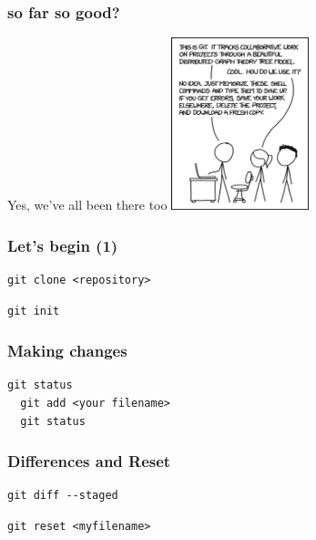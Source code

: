 \documentclass{beamer}
\begin{document}
\begin{frame}[fragile]
  \frametitle{so far so good?}

  \begin{block}{Yes, we've all been there too}
    \includegraphics[height=5cm]{xkcd.png}
  \end{block}

\end{frame}



\begin{frame}[fragile]
  \frametitle{Let's begin (1)}
  \begin{lstlisting}[caption=we can clone a repository from somewhere] 
  git clone <repository>
  \end{lstlisting}

  \begin{lstlisting}[caption=or create a new repository] 
  git init 
  \end{lstlisting}

\end{frame}


\begin{frame}[fragile]
  \frametitle{Making changes}
  
  \begin{lstlisting}[caption=Making changes] 
  git status
  git add <your filename>
  git status
  \end{lstlisting}

\end{frame}

\begin{frame}[fragile]
  \frametitle{Differences and Reset}
  
  \begin{lstlisting}[caption=Making changes] 
  git diff --staged
  \end{lstlisting}

  \begin{lstlisting}[caption=Reset changes] 
  git reset <myfilename>
  \end{lstlisting}

\end{frame}
\end{document}
